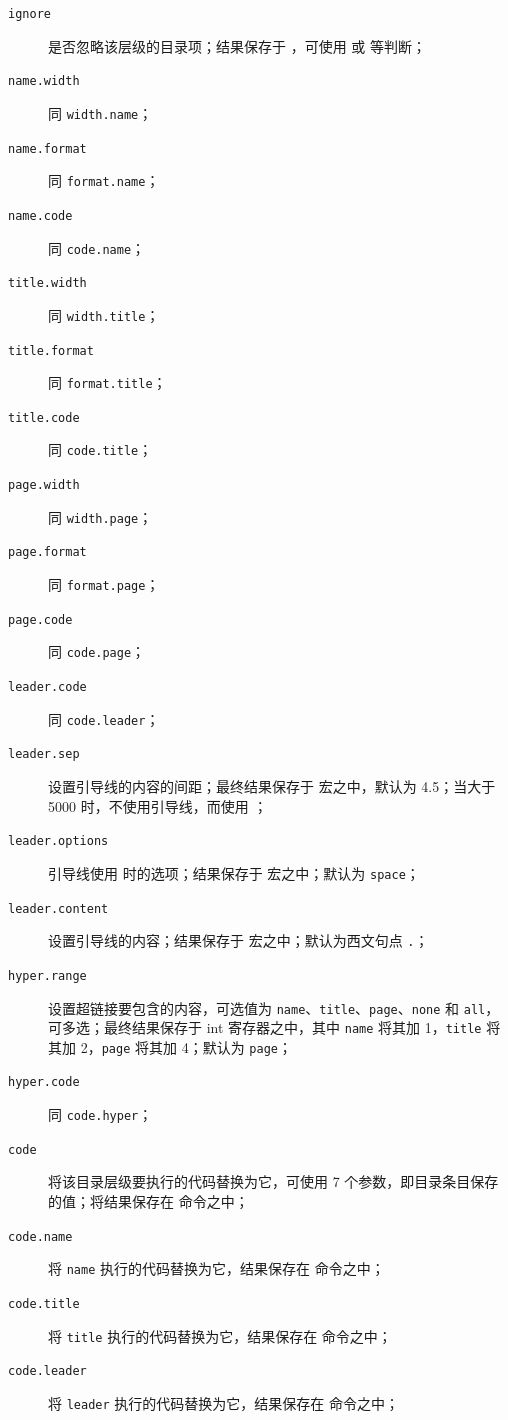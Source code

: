 \documentclass{cusdoc}
\begin{document}
\begin{description}
  \item[\texttt{ignore}] 是否忽略该层级的目录项；结果保存于 ，可使用  或  等判断；
  \item[\texttt{name.width}] 同 \texttt{width.name}；
  \item[\texttt{name.format}] 同 \texttt{format.name}；
  \item[\texttt{name.code}] 同 \texttt{code.name}；
  \item[\texttt{title.width}] 同 \texttt{width.title}；
  \item[\texttt{title.format}] 同 \texttt{format.title}；
  \item[\texttt{title.code}] 同 \texttt{code.title}；
  \item[\texttt{page.width}] 同 \texttt{width.page}；
  \item[\texttt{page.format}] 同 \texttt{format.page}；
  \item[\texttt{page.code}] 同 \texttt{code.page}；
  \item[\texttt{leader.code}] 同 \texttt{code.leader}；
  \item[\texttt{leader.sep}] 设置引导线的内容的间距；最终结果保存于  宏之中，默认为 4.5；当大于 5000 时，不使用引导线，而使用 ；
  \item[\texttt{leader.options}] 引导线使用  时的选项；结果保存于  宏之中；默认为 \texttt{space}；
  \item[\texttt{leader.content}] 设置引导线的内容；结果保存于  宏之中；默认为西文句点 \texttt{.}；
  \item[\texttt{hyper.range}] 设置超链接要包含的内容，可选值为 \texttt{name}、\texttt{title}、\texttt{page}、\texttt{none} 和 \texttt{all}，可多选；最终结果保存于  int 寄存器之中，其中 \texttt{name} 将其加 1，\texttt{title} 将其加 2，\texttt{page} 将其加 4；默认为 \texttt{page}；
  \item[\texttt{hyper.code}] 同 \texttt{code.hyper}；
  \item[\texttt{code}] 将该目录层级要执行的代码替换为它，可使用 7 个参数，即目录条目保存的值；将结果保存在  命令之中；
  \item[\texttt{code.name}] 将 \texttt{name} 执行的代码替换为它，结果保存在  命令之中；
  \item[\texttt{code.title}] 将 \texttt{title} 执行的代码替换为它，结果保存在  命令之中；
  \item[\texttt{code.leader}] 将 \texttt{leader} 执行的代码替换为它，结果保存在  命令之中；

\end{description}
\end{document}
